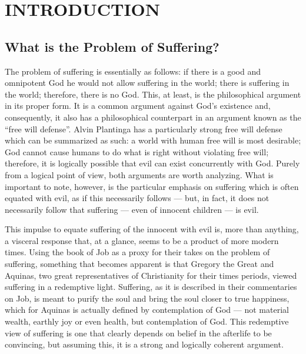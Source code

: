 \chapter{INTRODUCTION}


\label{introduction}

\section{What is the Problem of Suffering?}
The problem of suffering is essentially as follows: if there is a good and omnipotent God he would not allow suffering in the world; there is suffering in the world; therefore, there is no God. This, at least, is the philosophical argument in its proper form. It is a common argument against God's existence and, consequently, it also has a philosophical counterpart in an argument known as the ``free will defense''. Alvin Plantinga has a particularly strong free will defense which can be summarized as such: a world with human free will is most desirable; God cannot cause humans to do what is right without violating free will; therefore, it is logically possible that evil can exist concurrently with God. Purely from a logical point of view, both arguments are worth analyzing. What is important to note, however, is the particular emphasis on suffering which is often equated with evil, as if this necessarily follows --- but, in fact, it does not necessarily follow that suffering --- even of innocent children --- is evil.

This impulse to equate suffering of the innocent with evil is, more than anything, a visceral response that, at a glance, seems to be a product of more modern times. Using the book of Job as a proxy for their takes on the problem of suffering, something that becomes apparent is that Gregory the Great and Aquinas, two great representatives of Christianity for their times periods, viewed suffering in a redemptive light. Suffering, as it is described in their commentaries on Job, is meant to purify the soul and bring the soul closer to true happiness, which for Aquinas is actually defined by contemplation of God --- not material wealth, earthly joy or even health, but contemplation of God. This redemptive view of suffering is one that clearly depends on belief in the afterlife to be convincing, but assuming this, it is a strong and logically coherent argument.

